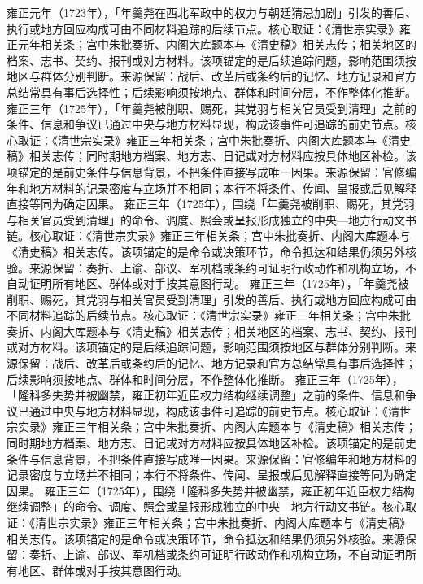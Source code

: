 雍正元年（1723年），「年羹尧在西北军政中的权力与朝廷猜忌加剧」引发的善后、执行或地方回应构成可由不同材料追踪的后续节点。核心取证：《清世宗实录》雍正元年相关条；宫中朱批奏折、内阁大库题本与《清史稿》相关志传；相关地区的档案、志书、契约、报刊或对方材料。该项锚定的是后续追踪问题，影响范围须按地区与群体分别判断。来源保留：战后、改革后或条约后的记忆、地方记录和官方总结常具有事后选择性；后续影响须按地点、群体和时间分层，不作整体化推断。
雍正三年（1725年），「年羹尧被削职、赐死，其党羽与相关官员受到清理」之前的条件、信息和争议已通过中央与地方材料显现，构成该事件可追踪的前史节点。核心取证：《清世宗实录》雍正三年相关条；宫中朱批奏折、内阁大库题本与《清史稿》相关志传；同时期地方档案、地方志、日记或对方材料应按具体地区补检。该项锚定的是前史条件与信息背景，不把条件直接写成唯一因果。来源保留：官修编年和地方材料的记录密度与立场并不相同；本行不将条件、传闻、呈报或后见解释直接等同为确定因果。
雍正三年（1725年），围绕「年羹尧被削职、赐死，其党羽与相关官员受到清理」的命令、调度、照会或呈报形成独立的中央—地方行动文书链。核心取证：《清世宗实录》雍正三年相关条；宫中朱批奏折、内阁大库题本与《清史稿》相关志传。该项锚定的是命令或决策环节，命令抵达和结果仍须另外核验。来源保留：奏折、上谕、部议、军机档或条约可证明行政动作和机构立场，不自动证明所有地区、群体或对手按其意图行动。
雍正三年（1725年），「年羹尧被削职、赐死，其党羽与相关官员受到清理」引发的善后、执行或地方回应构成可由不同材料追踪的后续节点。核心取证：《清世宗实录》雍正三年相关条；宫中朱批奏折、内阁大库题本与《清史稿》相关志传；相关地区的档案、志书、契约、报刊或对方材料。该项锚定的是后续追踪问题，影响范围须按地区与群体分别判断。来源保留：战后、改革后或条约后的记忆、地方记录和官方总结常具有事后选择性；后续影响须按地点、群体和时间分层，不作整体化推断。
雍正三年（1725年），「隆科多失势并被幽禁，雍正初年近臣权力结构继续调整」之前的条件、信息和争议已通过中央与地方材料显现，构成该事件可追踪的前史节点。核心取证：《清世宗实录》雍正三年相关条；宫中朱批奏折、内阁大库题本与《清史稿》相关志传；同时期地方档案、地方志、日记或对方材料应按具体地区补检。该项锚定的是前史条件与信息背景，不把条件直接写成唯一因果。来源保留：官修编年和地方材料的记录密度与立场并不相同；本行不将条件、传闻、呈报或后见解释直接等同为确定因果。
雍正三年（1725年），围绕「隆科多失势并被幽禁，雍正初年近臣权力结构继续调整」的命令、调度、照会或呈报形成独立的中央—地方行动文书链。核心取证：《清世宗实录》雍正三年相关条；宫中朱批奏折、内阁大库题本与《清史稿》相关志传。该项锚定的是命令或决策环节，命令抵达和结果仍须另外核验。来源保留：奏折、上谕、部议、军机档或条约可证明行政动作和机构立场，不自动证明所有地区、群体或对手按其意图行动。
